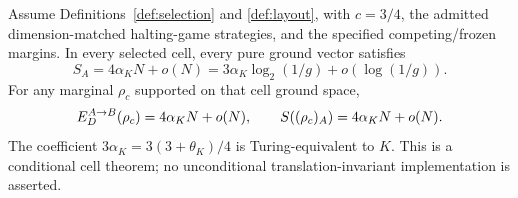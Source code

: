 \begin{theorem}\label{thm:conditional}
Assume Definitions~\ref{def:selection} and \ref{def:layout}, with
$c=3/4$, the admitted dimension-matched halting-game strategies, and
the specified competing/frozen margins. In every selected cell, every
pure ground vector satisfies
\begin{equation}\label{eq:conditional}
 S_A=4\alpha_KN+o(N)
    =3\alpha_K\log_2(1/g)+o(\log(1/g)).
\end{equation}
For any marginal $\rho_c$ supported on that cell ground space,
\begin{equation}\label{eq:marginal}
 E_D^{A\to B}(\rho_c)=4\alpha_KN+o(N),\qquad
 S((\rho_c)_A)=4\alpha_KN+o(N).
\end{equation}
The coefficient $3\alpha_K=3(3+\theta_K)/4$ is Turing-equivalent to
$K$. This is a conditional cell theorem; no unconditional
translation-invariant implementation is asserted.
\end{theorem}
